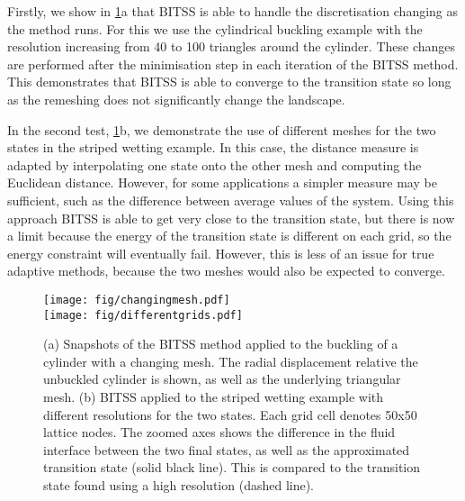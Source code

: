 \documentclass[aps,prl,twocolumn,groupedaddress]{revtex4}
\begin{document}
\topic Firstly, we show in \cref{fig:adaptivemesh}a that BITSS is able to handle the discretisation changing as the method runs.
For this we use the cylindrical buckling example with the resolution increasing from 40 to 100 triangles around the cylinder.
These changes are performed after the minimisation step in each iteration of the BITSS method.
This demonstrates that BITSS is able to converge to the transition state so long as the remeshing does not significantly change the landscape.

\topic In the second test, \cref{fig:adaptivemesh}b, we demonstrate the use of different meshes for the two states in the striped wetting example.
In this case, the distance measure is adapted by interpolating one state onto the other mesh and computing the Euclidean distance.
However, for some applications a simpler measure may be sufficient, such as the difference between average values of the system.
Using this approach BITSS is able to get very close to the transition state, but there is now a limit because the energy of the transition state is different on each grid, so the energy constraint will eventually fail.
However, this is less of an issue for true adaptive methods, because the two meshes would also be expected to converge.

\begin{figure}[tb]
  \texttt{[image: fig/changingmesh.pdf]}\\
  \texttt{[image: fig/differentgrids.pdf]}
  \caption{\label{fig:adaptivemesh}
    (a) Snapshots of the BITSS method applied to the buckling of a cylinder with a changing mesh.
        The radial displacement relative the unbuckled cylinder is shown, as well as the underlying triangular mesh.
    (b) BITSS applied to the striped wetting example with different resolutions for the two states.
        Each grid cell denotes 50x50 lattice nodes.
        The zoomed axes shows the difference in the fluid interface between the two final states, as well as the approximated transition state (solid black line).
        This is compared to the transition state found using a high resolution (dashed line).
  }
\end{figure}
\end{document}

